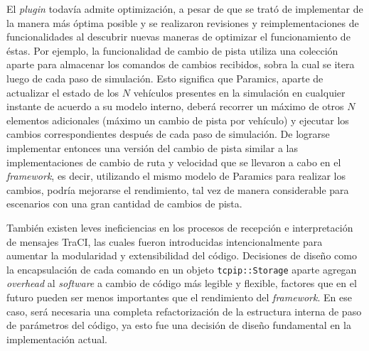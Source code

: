 El \emph{plugin} todavía admite optimización, a pesar de que se trató de implementar de la manera más óptima posible y se realizaron revisiones y reimplementaciones de funcionalidades al descubrir nuevas maneras de optimizar el funcionamiento de éstas. Por ejemplo, la funcionalidad de cambio de pista utiliza una colección aparte para almacenar los comandos de cambios recibidos, sobra la cual se itera luego de cada paso de simulación. 
Esto significa que Paramics, aparte de actualizar el estado de los $N$ vehículos presentes en la simulación en cualquier instante de acuerdo a su modelo interno, deberá recorrer un máximo de otros $N$ elementos adicionales (máximo un cambio de pista por vehículo) y ejecutar los cambios correspondientes después de cada paso de simulación.
De lograrse implementar entonces una versión del cambio de pista similar a las implementaciones de cambio de ruta y velocidad que se llevaron a cabo en el \emph{framework}, es decir, utilizando el mismo modelo de Paramics para realizar los cambios, podría mejorarse el rendimiento, tal vez de manera considerable para escenarios con una gran cantidad de cambios de pista. 

También existen leves ineficiencias en los procesos de recepción e interpretación de mensajes TraCI, las cuales fueron introducidas intencionalmente para aumentar la modularidad y extensibilidad del código. 
Decisiones de diseño como la encapsulación de cada comando en un objeto \texttt{tcpip::Storage} aparte agregan \emph{overhead} al \emph{software} a cambio de código más legible y flexible, factores que en el futuro pueden ser menos importantes que el rendimiento del \emph{framework}. En ese caso, será necesaria una completa refactorización de la estructura interna de paso de parámetros del código, ya esto fue una decisión de diseño fundamental en la implementación actual.